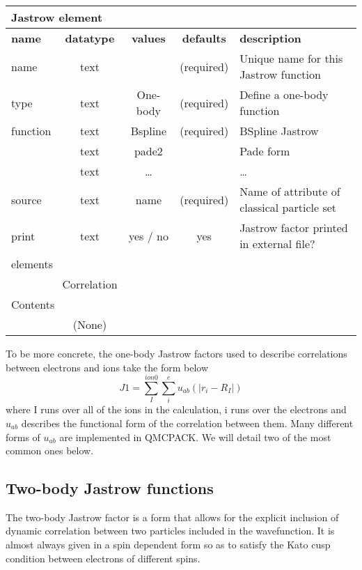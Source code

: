 \begin{table}[h]
\begin{center}
\begin{tabular}{l c c c l }
\hline
\multicolumn{5}{l}{Jastrow element} \\
\hline
\bfseries name & \bfseries datatype & \bfseries values & \bfseries defaults  & \bfseries description \\
\hline
name & text &    & (required) & Unique name for this Jastrow function \\
type & text & One-body & (required) & Define a one-body function \\ 
function & text & Bspline & (required) & BSpline Jastrow \\
             & text & pade2 & & Pade form \\
             & text & \ldots & & \ldots \\
source & text & name & (required) & Name of attribute of classical particle set \\ 
print & text & yes / no & yes & Jastrow factor printed in external file?\\
  \hline
\multicolumn{5}{l}{elements}\\ \hline
& Correlation & & & \\ \hline
\multicolumn{5}{l}{Contents}\\ \hline
& (None)  & & &  \\ \hline
\end{tabular}
\end{center}
\end{table}

To be more concrete, the one-body Jastrow factors used to describe correlations
between electrons and ions take the form below
\begin{equation}
J1=\sum_I^{ion0}\sum_i^e u_{ab}(|r_i-R_I|)
\end{equation}
where I runs over all of the ions in the calculation, i runs over the electrons
and $u_{ab}$ describes the functional form of the correlation between them.
Many different forms of $u_{ab}$ are implemented in QMCPACK.  We will detail 
two of the most common ones below.




\subsection{Two-body Jastrow functions}
The two-body Jastrow factor is a form that allows for the explicit inclusion
of dynamic correlation between two particles included in the wavefunction.  It
is almost always given in a spin dependent form so as to satisfy the Kato cusp
condition between electrons of different spins\cite{kato}.

